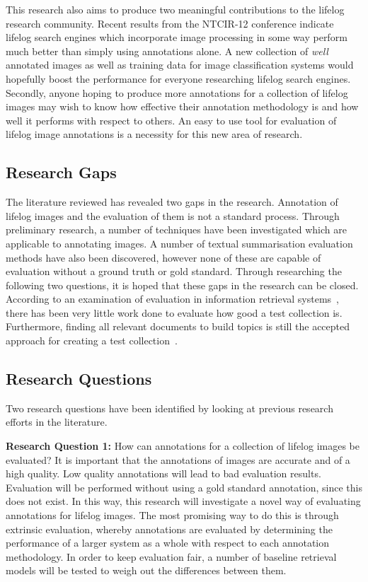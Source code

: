 \documentclass[12pt,a4paper]{article}
\begin{document}
This research also aims to produce two meaningful contributions to the lifelog research community. Recent results from the NTCIR-12 conference indicate lifelog search engines which incorporate image processing in some way perform much better than simply using annotations alone. A new collection of \textit{well} annotated images as well as training data for image classification systems would hopefully boost the performance for everyone researching lifelog search engines. Secondly, anyone hoping to produce more annotations for a collection of lifelog images may wish to know how effective their annotation methodology is and how well it performs with respect to others. An easy to use tool for evaluation of lifelog image annotations is a necessity for this new area of research.

\subsection{Research Gaps}

The literature reviewed has revealed two gaps in the research. Annotation of lifelog images and the evaluation of them is not a standard process. Through preliminary research, a number of techniques have been investigated which are applicable to annotating images. A number of textual summarisation evaluation methods have also been discovered, however none of these are capable of evaluation without a ground truth or gold standard. Through researching the following two questions, it is hoped that these gaps in the research can be closed. According to an examination of evaluation in information retrieval systems~\citep[p. 24]{sanderson2010test}, there has been very little work done to evaluate how good a test collection is. Furthermore, finding all relevant documents to build topics is still the accepted approach for creating a test collection~\citep{cooper1973selecting}.

\subsection{Research Questions}

Two research questions have been identified by looking at previous research efforts in the literature. 

\textbf{Research Question 1:} How can annotations for a collection of lifelog images be evaluated? It is important that the annotations of images are accurate and of a high quality. Low quality annotations will lead to bad evaluation results. Evaluation will be performed without using a gold standard annotation, since this does not exist. In this way, this research will investigate a novel way of evaluating annotations for lifelog images. The most promising way to do this is through extrinsic evaluation, whereby annotations are evaluated by determining the performance of a larger system as a whole with respect to each annotation methodology. In order to keep evaluation fair, a number of baseline retrieval models will be tested to weigh out the differences between them.
\end{document}
